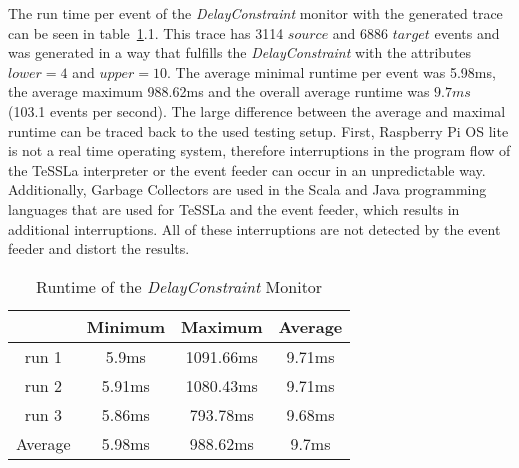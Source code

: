 	The run time per event of the \emph{DelayConstraint} monitor with the generated trace can be seen in table~\ref{tab:runtimeDelay}.1. This trace has 3114 $source$ and 6886 $target$ events and was generated in a way that fulfills the \emph{DelayConstraint} with the attributes $lower = 4$ and $upper=10$. The average minimal runtime per event was 5.98ms, the average maximum 988.62ms and the overall average runtime was $9.7ms$ (103.1 events per second). The large difference between the average and maximal runtime can be traced back to the used testing setup. First, Raspberry Pi OS lite is not a real time operating system, therefore interruptions in the program flow of the TeSSLa interpreter or the event feeder can occur in an unpredictable way. Additionally, Garbage Collectors are used in the Scala and Java programming languages that are used for TeSSLa and the event feeder, which results in additional interruptions. All of these interruptions are not detected by the event feeder and distort the results. 
	\begin{table}
		\begin{tabular}{|c|c|c|c|}
			\hline
					& Minimum & Maximum & Average \\
			\hline
			run 1	& 5.9ms  & 1091.66ms & 9.71ms\\
			\hline
			run 2	& 5.91ms & 1080.43ms & 9.71ms\\
			\hline
			run 3	& 5.86ms &  793.78ms & 9.68ms\\
			\hline
			Average & 5.98ms & 988.62ms & 9.7ms\\
			\hline
		\end{tabular}
		\centering
		\label{tab:runtimeDelay}
		\caption{Runtime of the \emph{DelayConstraint} Monitor}
	\end{table}
	
	

